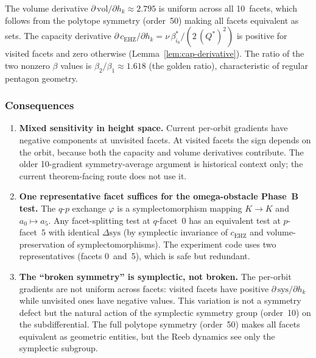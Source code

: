 The volume derivative $\partial\,\mathrm{vol}/\partial h_k \approx 2.795$ is
uniform across all 10~facets,
which follows from the polytope symmetry (order~50) making all
facets equivalent as sets.
The capacity derivative
$\partial\,c_{\mathrm{EHZ}}/\partial h_k
= \nu\,\beta_{i_0}^* / (2\,(Q^*)^2)$
is positive for visited facets and zero otherwise
(Lemma~\ref{lem:cap-derivative}).
The ratio of the two nonzero $\beta$ values is
$\beta_2 / \beta_1 \approx 1.618$ (the golden ratio),
characteristic of regular pentagon geometry.

\subsubsection*{Consequences}

\begin{enumerate}
\item \textbf{Mixed sensitivity in height space.}
  Current per-orbit gradients have negative components at unvisited facets.
  At visited facets the sign depends on the orbit, because both the capacity
  and volume derivatives contribute.
  The older 10-gradient symmetry-average argument is historical context only;
  the current theorem-facing route does not use it.

\item \textbf{One representative facet suffices for the omega-obstacle
  Phase~B test.}
  The $q$\nobreakdash-$p$ exchange $\varphi$ is a symplectomorphism
  mapping $K \to K$ and $a_0 \mapsto a_5$.
  Any facet-splitting test at $q$-facet~$0$ has an equivalent test at
  $p$-facet~$5$ with identical $\Delta\mathrm{sys}$
  (by symplectic invariance of $c_{\mathrm{EHZ}}$
  and volume-preservation of symplectomorphisms).
  The experiment code uses two representatives (facets 0~and~5), which
  is safe but redundant.

\item \textbf{The ``broken symmetry'' is symplectic, not broken.}
  The per-orbit gradients are not uniform across facets: visited facets
  have positive $\partial\,\mathrm{sys}/\partial h_k$
  while unvisited ones have negative values.
  This variation is not a symmetry defect but the natural action of the
  symplectic symmetry group (order~10) on the subdifferential.
  The full polytope symmetry (order~50) makes all facets equivalent
  as geometric entities, but the Reeb dynamics see only the symplectic
  subgroup.
\end{enumerate}
